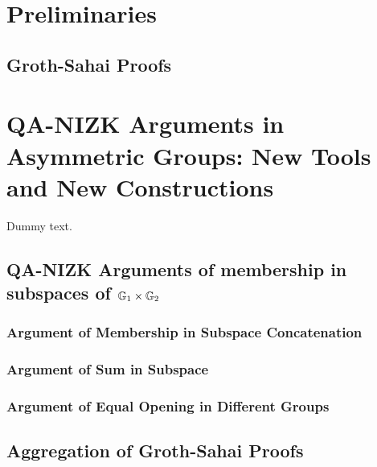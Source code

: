 \chapter{Preliminaries}

    \section{Groth-Sahai Proofs}\label{sec:gs-proofs}

\chapter{QA-NIZK Arguments in Asymmetric Groups: New Tools and New Constructions}
Dummy text.
    
    \section{QA-NIZK Arguments of membership in subspaces of $\mathbb{G}_1\times\mathbb{G}_2$}\label{sec:agg-asym}
    
        

        \subsection{Argument of Membership in Subspace Concatenation}\label{sec:concat}

        

        \subsection{Argument of Sum in Subspace}\label{sec:sum}
        
        

        \subsection{Argument of Equal Opening in Different Groups} \label{sec:aggcommit}

         

    \section{Aggregation of Groth-Sahai Proofs}\label{sec:agg-gs}

        

